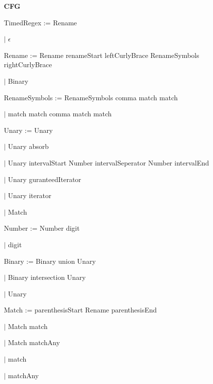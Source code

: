 
\textbf{CFG}

TimedRegex := Rename

\qquad	$\mid$ $\epsilon$

Rename := Rename renameStart leftCurlyBrace RenameSymbols rightCurlyBrace

\qquad $\mid$ Binary

RenameSymbols := RenameSymbols comma match match

\qquad $\mid$ match match comma match match

Unary := Unary

\qquad $\mid$ Unary absorb

\qquad $\mid$ Unary intervalStart Number intervalSeperator Number intervalEnd

\qquad $\mid$ Unary guranteedIterator

\qquad $\mid$ Unary iterator

\qquad $\mid$ Match

Number := Number digit

\qquad $\mid$ digit

Binary := Binary union Unary

\qquad $\mid$ Binary intersection Unary

\qquad $\mid$ Unary

Match := parenthesisStart Rename parenthesisEnd

\qquad $\mid$ Match match

\qquad $\mid$ Match matchAny

\qquad $\mid$ match

\qquad $\mid$ matchAny


